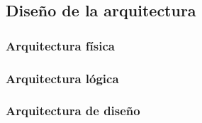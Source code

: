 \subsection{Diseño de la arquitectura}


\subsubsection{Arquitectura física}

\subsubsection{Arquitectura lógica}


\subsubsection{Arquitectura de diseño}

\newpage
